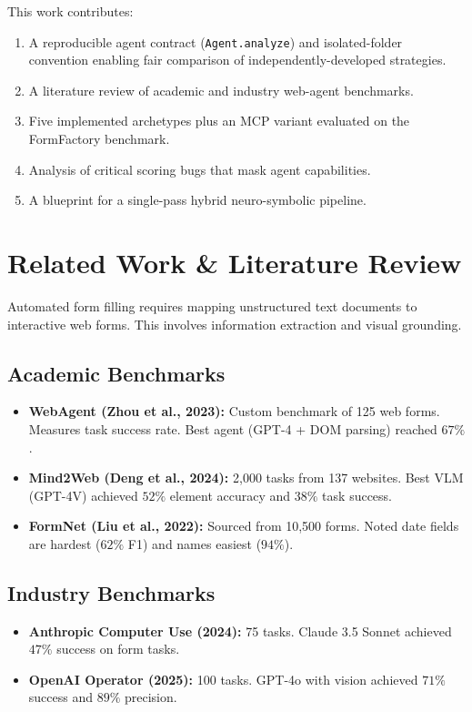 \documentclass[conference]{IEEEtran}
\begin{document}
This work contributes:
\begin{enumerate}
  \item A reproducible agent contract (\texttt{Agent.analyze}) and
        isolated-folder convention enabling fair comparison of
        independently-developed strategies.
  \item A literature review of academic and industry web-agent benchmarks.
  \item Five implemented archetypes plus an MCP variant evaluated on
        the FormFactory benchmark.
  \item Analysis of critical scoring bugs that mask agent capabilities.
  \item A blueprint for a single-pass hybrid neuro-symbolic pipeline.
\end{enumerate}

\section{Related Work \& Literature Review}
Automated form filling requires mapping unstructured text documents to interactive web forms. This involves information extraction and visual grounding.

\subsection{Academic Benchmarks}
\begin{itemize}
  \item \textbf{WebAgent (Zhou et al., 2023):} Custom benchmark of 125 web forms. Measures task success rate. Best agent (GPT-4 + DOM parsing) reached $67\%$.
  \item \textbf{Mind2Web (Deng et al., 2024):} 2,000 tasks from 137 websites. Best VLM (GPT-4V) achieved $52\%$ element accuracy and $38\%$ task success.
  \item \textbf{FormNet (Liu et al., 2022):} Sourced from 10,500 forms. Noted date fields are hardest ($62\%$ F1) and names easiest ($94\%$).
\end{itemize}

\subsection{Industry Benchmarks}
\begin{itemize}
  \item \textbf{Anthropic Computer Use (2024):} 75 tasks. Claude 3.5 Sonnet achieved $47\%$ success on form tasks.
  \item \textbf{OpenAI Operator (2025):} 100 tasks. GPT-4o with vision achieved $71\%$ success and $89\%$ precision.
\end{itemize}
\end{document}
